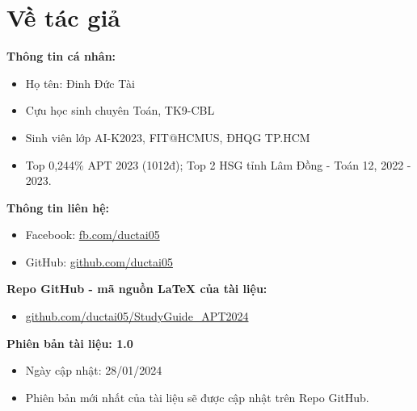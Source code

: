\section{Về tác giả}
\textbf{Thông tin cá nhân:}
\begin{itemize}
    \item Họ tên: Đinh Đức Tài
    \item Cựu học sinh chuyên Toán, TK9-CBL
    \item Sinh viên lớp AI-K2023, FIT@HCMUS, ĐHQG TP.HCM
    \item Top 0,244\% APT 2023 (1012đ); Top 2 HSG tỉnh Lâm Đồng - Toán 12, 2022 - 2023.
\end{itemize}
\textbf{Thông tin liên hệ:}
\begin{itemize}
    \item Facebook: \href{fb.com/ductai05}{fb.com/ductai05}
    \item GitHub: \href{github.com/ductai05}{github.com/ductai05}
\end{itemize}
\textbf{Repo GitHub - mã nguồn LaTeX của tài liệu:} 
\begin{itemize}
    \item \href{github.com/ductai05/StudyGuide_APT2024}{github.com/ductai05/StudyGuide\_APT2024}
\end{itemize}
\textbf{Phiên bản tài liệu: 1.0}
\begin{itemize}
    \item Ngày cập nhật: 28/01/2024
    \item Phiên bản mới nhất của tài liệu sẽ được cập nhật trên Repo GitHub.
\end{itemize}

